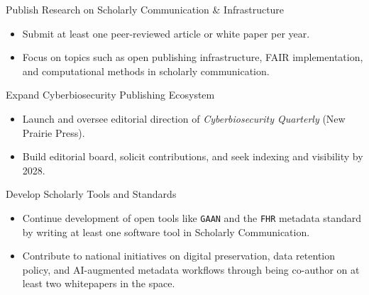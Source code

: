\LibraryEntry
  {}
  {Publish Research on Scholarly Communication \& Infrastructure}
  {}
  {}
  {}
  {
  \begin{itemize}
    \item Submit at least one peer-reviewed article or white paper per year.
    \item Focus on topics such as open publishing infrastructure, FAIR implementation, and computational methods in scholarly communication.
  \end{itemize}
  }

\LibraryEntry
  {}
  {Expand Cyberbiosecurity Publishing Ecosystem}
  {}
  {}
  {}
  {
  \begin{itemize}
    \item Launch and oversee editorial direction of \textit{Cyberbiosecurity Quarterly} (New Prairie Press).
    \item Build editorial board, solicit contributions, and seek indexing and visibility by 2028.
  \end{itemize}
  }

\LibraryEntry
  {}
  {Develop Scholarly Tools and Standards}
  {}
  {}
  {}
  {
  \begin{itemize}
    \item Continue development of open tools like \texttt{GAAN} and the \texttt{FHR} metadata standard by writing at least one software tool in Scholarly Communication.
    \item Contribute to national initiatives on digital preservation, data retention policy, and AI-augmented metadata workflows through being co-author on at least two whitepapers in the space.
  \end{itemize}
  }
